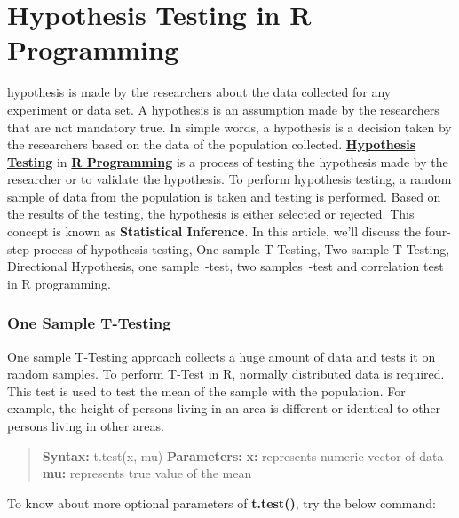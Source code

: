\documentclass[
  letterpaper,
  DIV=11,
  numbers=noendperiod]{scrreprt}
\begin{document}
\hypertarget{hypothesis-testing-in-r-programming}{%
\section{Hypothesis Testing in R
Programming}\label{hypothesis-testing-in-r-programming}}

hypothesis is made by the researchers about the data collected for any
experiment or data set. A hypothesis is an assumption made by the
researchers that are not mandatory true. In simple words, a hypothesis
is a decision taken by the researchers based on the data of the
population collected.
\href{https://www.geeksforgeeks.org/understanding-hypothesis-testing/}{\textbf{Hypothesis
Testing}} in
\href{https://www.geeksforgeeks.org/introduction-to-r-programming-language/}{\textbf{R
Programming}} is a process of testing the hypothesis made by the
researcher or to validate the hypothesis. To perform hypothesis testing,
a random sample of data from the population is taken and testing is
performed. Based on the results of the testing, the hypothesis is either
selected or rejected. This concept is known as \textbf{Statistical
Inference}. In this article, we'll discuss the four-step process of
hypothesis testing, One sample T-Testing, Two-sample T-Testing,
Directional Hypothesis, one
sample~-test,
two
samples~-test
and correlation test in R programming.

\hypertarget{one-sample-t-testing}{%
\subsubsection{One Sample T-Testing}\label{one-sample-t-testing}}

One sample T-Testing approach collects a huge amount of data and tests
it on random samples. To perform T-Test in R, normally distributed data
is required. This test is used to test the mean of the sample with the
population. For example, the height of persons living in an area is
different or identical to other persons living in other areas.

\begin{quote}
\textbf{Syntax:} t.test(x, mu) \textbf{Parameters:} \textbf{x:}
represents numeric vector of data \textbf{mu:} represents true value of
the mean
\end{quote}

To know about more optional parameters of \textbf{t.test()}, try the
below command:
\end{document}
